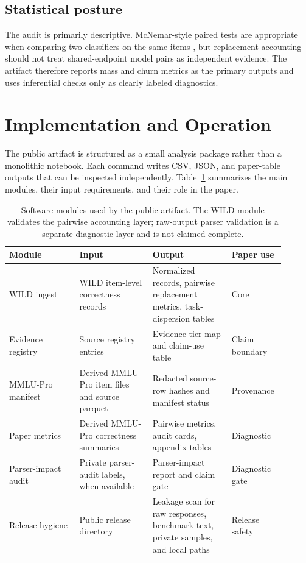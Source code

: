 \documentclass[manuscript, screen, review, nonacm]{jair}
\begin{document}
\subsection{Statistical posture}

The audit is primarily descriptive. McNemar-style paired tests are appropriate when comparing two classifiers on the same items \parencite{mcnemar1947note,dietterich1998approximate}, but replacement accounting should not treat shared-endpoint model pairs as independent evidence. The artifact therefore reports mass and churn metrics as the primary outputs and uses inferential checks only as clearly labeled diagnostics.

\section{Implementation and Operation}

The public artifact is structured as a small analysis package rather than a monolithic notebook. Each command writes CSV, JSON, and paper-table outputs that can be inspected independently. Table~\ref{tab:module-map} summarizes the main modules, their input requirements, and their role in the paper.

\begin{table}[t]
\centering
\small
\begin{tabular}{p{0.24\linewidth}p{0.25\linewidth}p{0.27\linewidth}p{0.14\linewidth}}
\toprule
Module & Input & Output & Paper use \\
\midrule
WILD ingest & WILD item-level correctness records & Normalized records, pairwise replacement metrics, task-dispersion tables & Core \\
Evidence registry & Source registry entries & Evidence-tier map and claim-use table & Claim boundary \\
MMLU-Pro manifest & Derived MMLU-Pro item files and source parquet & Redacted source-row hashes and manifest status & Provenance \\
Paper metrics & Derived MMLU-Pro correctness summaries & Pairwise metrics, audit cards, appendix tables & Diagnostic \\
Parser-impact audit & Private parser-audit labels, when available & Parser-impact report and claim gate & Diagnostic gate \\
Release hygiene & Public release directory & Leakage scan for raw responses, benchmark text, private samples, and local paths & Release safety \\
\bottomrule
\end{tabular}
\caption{Software modules used by the public artifact. The WILD module validates the pairwise accounting layer; raw-output parser validation is a separate diagnostic layer and is not claimed complete.}
\label{tab:module-map}
\end{table}
\end{document}

